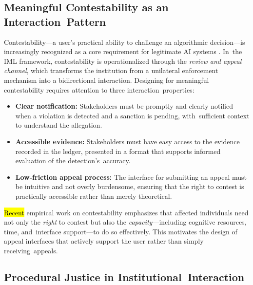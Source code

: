 \documentclass[mca,article,accept,pdftex,oneauthor]{Definitions/mdpi}
\begin{document}
\subsection{Meaningful Contestability as an Interaction~Pattern}

Contestability---a user's practical ability to challenge an algorithmic decision---is increasingly recognized as a core requirement for legitimate AI systems \citep{Lyons2021Contestability}. In~the IML framework, contestability is operationalized through the \emph{review and appeal channel}, which transforms the institution from a unilateral enforcement mechanism into a bidirectional interaction. Designing for meaningful contestability requires attention to three interaction~properties:
\begin{itemize}
    \item \textbf{Clear notification:} Stakeholders must be promptly and clearly notified when a violation is detected and a sanction is pending, with~sufficient context to understand the allegation.
    \item \textbf{Accessible evidence:} Stakeholders must have easy access to the evidence recorded in the ledger, presented in a format that supports informed evaluation of the \mbox{detection's accuracy.}
    \item \textbf{Low-friction appeal process:} The interface for submitting an appeal must be intuitive and not overly burdensome, ensuring that the right to contest is practically accessible rather than merely theoretical.
\end{itemize}

\hl{Recent} %
 empirical work on contestability \citep{Yurrita2025Contestability} emphasizes that affected individuals need not only the \emph{right} to contest but also the \emph{capacity}---including cognitive resources, time, and~interface support---to do so effectively. This motivates the design of appeal interfaces that actively support the user rather than simply receiving~appeals.

\subsection{Procedural Justice in Institutional~Interaction}
\end{document}
